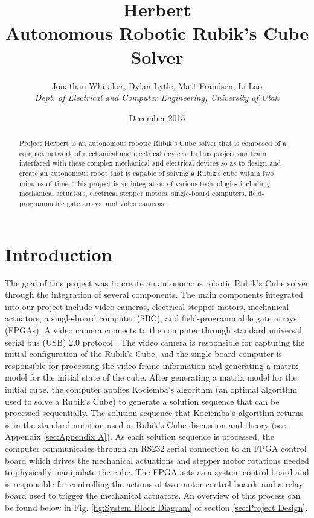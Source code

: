 \documentclass[final, letterpaper, 10 pt, conference, onecolumn]{IEEEtran}
\title{Herbert\\Autonomous Robotic Rubik's Cube Solver}
\author{
    Jonathan Whitaker, Dylan Lytle, Matt Frandsen, Li Lao\\
    \textit{Dept. of Electrical and Computer Engineering, University of Utah}\\
}
\date{December 2015}
\begin{document}
\maketitle

\begin{abstract}
Project Herbert is an autonomous robotic Rubik's Cube solver that is composed of a complex network of mechanical and electrical devices. In this project our team interfaced with these complex mechanical and electrical devices so as to design and create an autonomous robot that is capable of solving a Rubik's cube within two minutes of time.  This project is an integration of various technologies including: mechanical actuators, electrical stepper motors, single-board computers, field-programmable gate arrays, and video cameras.
\end{abstract}

\section{Introduction}
\label{sec:intro}
The goal of this project was to create an autonomous robotic Rubik's Cube solver through the integration of several components. The main components integrated into our project include video cameras, electrical stepper motors, mechanical actuators, a single-board computer (SBC), and field-programmable gate arrays (FPGAs). A video camera connects to the computer through standard universal serial bus (USB) 2.0 protocol \cite{USB2.0}. The video camera is responsible for capturing the initial configuration of the Rubik's Cube, and the single board computer is responsible for processing the video frame information and generating a matrix model for the initial state of the cube. After generating a matrix model for the initial cube, the computer applies Kociemba's algorithm \cite{Kociemba} (an optimal algorithm used to solve a Rubik's Cube) to generate a solution sequence that can be processed sequentially. The solution sequence that Kociemba's algorithm returns is in the standard notation used in Rubik's Cube discussion and theory (see Appendix \ref{sec:Appendix A}). As each solution sequence is processed, the computer communicates through an RS232 serial connection to an FPGA control board which drives the mechanical actuations and stepper motor rotations needed to physically manipulate the cube. The FPGA acts as a system control board and is responsible for controlling the actions of two motor control boards and a relay board used to trigger the mechanical actuators. An overview of this process can be found below in Fig. \ref{fig:System Block Diagram} of section \ref{sec:Project Design}.
\end{document}

